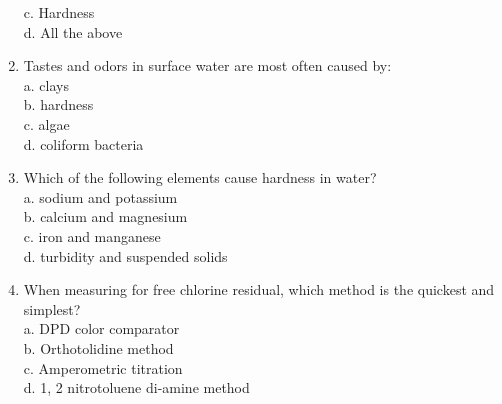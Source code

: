 \begin{enumerate}[1.]
c. Hardness\\
d. All the above\\
\item Tastes and odors in surface water are most often caused by:\\
a. clays\\
b. hardness\\
c. algae\\
d. coliform bacteria\\
\item Which of the following elements cause hardness in water?\\
a. sodium and potassium\\
b. calcium and magnesium\\
c. iron and manganese\\
d. turbidity and suspended solids\\
\item When measuring for free chlorine residual, which method is the quickest and simplest?\\
a. DPD color comparator\\
b. Orthotolidine method\\
c. Amperometric titration\\
d. 1, 2 nitrotoluene di-amine method\\

\end{enumerate}
